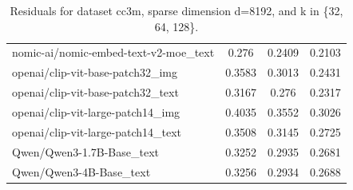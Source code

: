 \begin{table}[ht]
\begin{tabular}{lccc}
nomic-ai/nomic-embed-text-v2-moe\_text & 0.276 & 0.2409 & 0.2103 \\
openai/clip-vit-base-patch32\_img & 0.3583 & 0.3013 & 0.2431 \\
openai/clip-vit-base-patch32\_text & 0.3167 & 0.276 & 0.2317 \\
openai/clip-vit-large-patch14\_img & 0.4035 & 0.3552 & 0.3026 \\
openai/clip-vit-large-patch14\_text & 0.3508 & 0.3145 & 0.2725 \\
Qwen/Qwen3-1.7B-Base\_text & 0.3252 & 0.2935 & 0.2681 \\
Qwen/Qwen3-4B-Base\_text & 0.3256 & 0.2934 & 0.2688 \\
\hline
\end{tabular}
\caption{Residuals for dataset cc3m, sparse dimension d=8192, and k in \{32, 64, 128\}.}
\label{tab:residuals_cc3m_d_8192}
\end{table}
